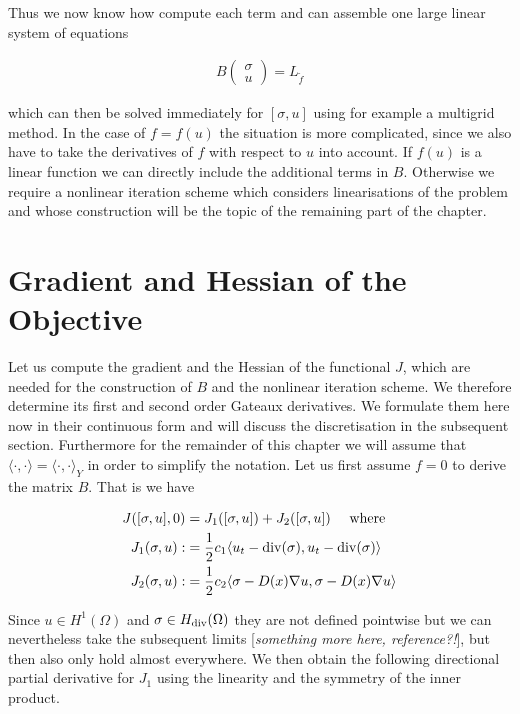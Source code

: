 \documentclass[../draft_1.tex]{subfiles}
\begin{document}
Thus we now know how compute each term and can assemble one large linear system of equations
\begin{ceqn}
	\begin{align}
B
\begin{pmatrix}
\sigma \\
u
\end{pmatrix} = L_{\tilde{f}}
	\end{align}
\end{ceqn}
which can then be solved immediately for $[\sigma, u]$ using for example a multigrid method. In the case of $f = f(u)$ the situation is more complicated, since we also have to take the derivatives of $f$ with respect to $u$ into account. If $f(u)$ is a linear function we can directly include the additional terms in $B$. Otherwise we require a nonlinear iteration scheme which considers linearisations of the problem and whose construction will be the topic of the remaining part of the chapter. 

\section{Gradient and Hessian of the Objective}
Let us compute the gradient and the Hessian of the functional $J$, which are needed for the construction of $B$ and the nonlinear iteration scheme. We therefore determine its first and second order Gateaux derivatives. We formulate them here now in their continuous form and will discuss the discretisation in the subsequent section. Furthermore for the remainder of this chapter we will assume that $\langle \cdot, \cdot \rangle = \langle \cdot, \cdot \rangle _Y$ in order to simplify the notation. Let us first assume $f = 0$ to derive the matrix $B$. That is we have 

\begin{equation}
\begin{aligned}
J([\sigma, u], 0)& = J_1([\sigma, u]) + J_2([\sigma, u]) \quad \text{ where } \\
J_1(\sigma, u) : &= \frac{1}{2}c_1\langle u_t - \mathop{}\!\mathrm{div}(\sigma), u_t - \mathop{}\!\mathrm{div}(\sigma) \rangle \\
J_2(\sigma, u) :&= \frac{1}{2} c_2\langle \sigma - D(x) \nabla u, \sigma  - D(x) \nabla u \rangle
\end{aligned}
\end{equation}

Since $u \in H^1(\Omega)$ and $\sigma \in H_{\mathop{}\!\mathrm{div}}(\Omega)$ they are not defined pointwise but we can nevertheless take the subsequent limits [\textit{something more here, reference?!}], but then also only hold almost everywhere. We then obtain the following directional partial derivative for $J_1$ using the linearity and the symmetry of the inner product. 
\end{document}
